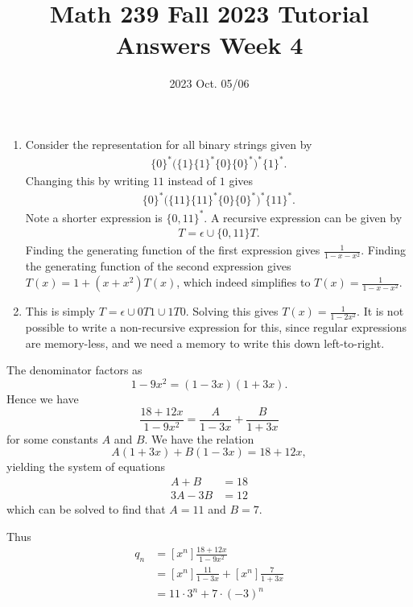 \title{Math 239 Fall 2023 Tutorial Answers Week 4}

\date{2023 Oct. 05/06}
\maketitle

\begin{enumerate}
    \begin{enumerate}
        \item Consider the representation for all binary strings given by
        \begin{align*}
            \{ 0\}^* \big( \{ 1\} \{1\}^* \{ 0 \} \{ 0 \}^*  \big)^* \{1\}^*.
        \end{align*}
        Changing this by writing $11$ instead of $1$ gives
        \begin{align*}
            \{ 0\}^* \big( \{ 11\} \{11\}^* \{ 0 \} \{ 0 \}^*  \big)^* \{11\}^*.
        \end{align*}
        Note a shorter expression is $\{ 0 ,11 \}^*$. A recursive expression can be given by
        \begin{align*}
            T = \epsilon \cup \{ 0,11\} T.
        \end{align*}
        Finding the generating function of the first expression gives $\frac{1}{1-x-x^2}$. Finding the generating function of the second expression gives $T(x) = 1 + (x+x^2)T(x)$, which indeed simplifies to $T(x) = \frac{1}{1-x-x^2}$.
        \item This is simply $T = \epsilon \cup 0T1 \cup 1T0$. Solving this gives $T(x) = \frac{1}{1-2x^2}$. It is not possible to write a non-recursive expression for this, since regular expressions are memory-less, and we need a memory to write this down left-to-right.
    \end{enumerate}
    
The denominator factors as
    \[1-9x^2 = (1-3x)(1+3x).\]
    Hence we have
    \[\frac{18 + 12x}{1-9x^2} = \frac{A}{1-3x} + \frac{B}{1+3x}\]
    for some constants $A$ and $B$. We have the relation
    \[A(1+3x) + B(1-3x) = 18 + 12x,\]
    yielding the system of equations
    \begin{align*}
        A + B &= 18\\
        3A - 3B &= 12
    \end{align*}
    which can be solved to find that $A=11$ and $B=7$.
    
    Thus
    \begin{align*}
        q_n &= [x^n]\frac{18 + 12x}{1-9x^2} \\
        &= [x^n]\frac{11}{1-3x} + [x^n]\frac{7}{1+3x}\\
        &= 11 \cdot 3^n + 7 \cdot (-3)^n
    \end{align*}


\end{enumerate}
